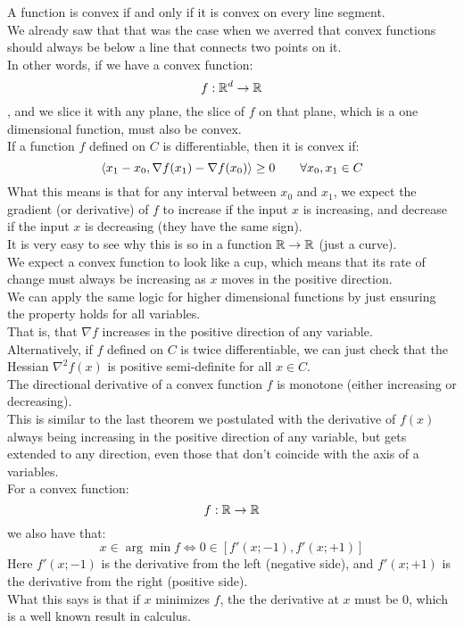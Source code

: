 \documentclass[12pt]{article}
\begin{document}
A function is convex if and only if it is
convex on every line segment. \\
We already saw that that was the case
when we averred that convex functions
should always be below a line
that connects two points on it. \\
In other words, if we have a convex function:
\[ f: \mathbb{R}^d \to \mathbb{R} \],
and we slice it with any plane,
the slice of $f$ on that plane,
which is a one dimensional function,
must also be convex. \\

If a function $f$ defined on $C$ is
differentiable,
then it is convex if:
\[ \left\langle x_1 - x_0, 
\nabla f(x_1) - \nabla f(x_0) \right\rangle \geq 0 \qquad
\forall x_0, x_1 \in C \]
What this means is that for any interval
between $x_0$ and $x_1$,
we expect the gradient (or derivative)
of $f$ to increase if the input $x$
is increasing,
and decrease if the input $x$ is decreasing
(they have the same sign). \\
It is very easy to see why this is so
in a function $\mathbb{R} \to \mathbb{R}$
(just a curve). \\
We expect a convex function to look like a cup,
which means that its rate of change must
always be increasing as $x$ moves in the
positive direction. \\
We can apply the same logic for higher
dimensional functions
by just ensuring the property holds
for all variables. \\
That is, that $\nabla f$
increases in the positive direction
of any variable. \\

Alternatively,
if $f$ defined on $C$ is twice differentiable,
we can just check that the Hessian
$\nabla^2 f(x)$ is positive semi-definite
for all $x \in C$. \\

The directional derivative of a convex
function $f$ is monotone (either increasing
or decreasing). \\
This is similar to the last theorem
we postulated with the derivative of $f(x)$
always being increasing in the positive
direction of any variable,
but gets extended to any direction,
even those that don't coincide
with the axis of a variables. \\

For a convex function:
\[ f:\mathbb{R} \to \mathbb{R} \]
we also have that:
\[ x \in \arg \min f \iff 
0 \in [f'(x; -1), f'(x; +1)] \]
Here $f'(x; -1)$ is the derivative from
the left (negative side),
and $f'(x; +1)$ is the derivative
from the right (positive side). \\
What this says is that if $x$ minimizes $f$,
the the derivative at $x$
must be $0$,
which is a well known result in calculus. \\
\end{document}
